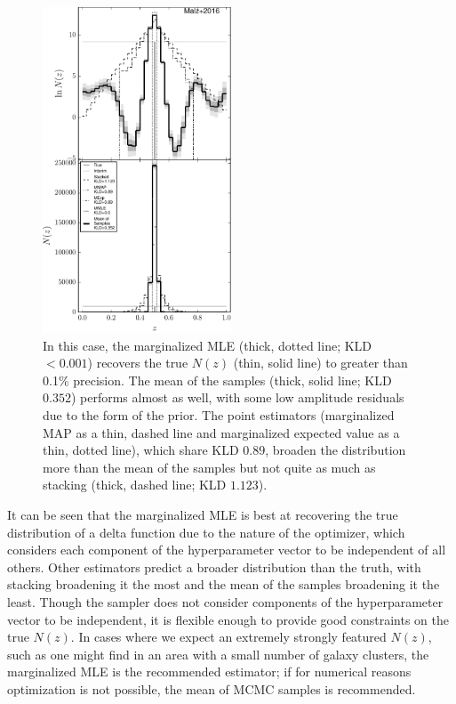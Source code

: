 \documentclass[preprint]{aastex}
\begin{document}

\begin{figure}
\includegraphics[width=0.5\textwidth]{figs/delt/comps.pdf}
\caption{In this case, the marginalized MLE (thick, dotted line; KLD $<0.001$) 
recovers the true $N(z)$ (thin, solid line) to greater than 0.1\% precision.  
The mean of the samples (thick, solid line; KLD $0.352$) performs almost as 
well, with some low amplitude residuals due to the form of the prior.  The 
point estimators (marginalized MAP as a thin, dashed line and marginalized 
expected value as a thin, dotted line), which share KLD $0.89$, broaden the 
distribution more than the mean of the samples but not quite as much as 
stacking (thick, dashed line; KLD $1.123$).}
\label{fig:toy-comp}
\end{figure}

It can be seen that the marginalized MLE is best at recovering the true 
distribution of a delta function due to the nature of the optimizer, which 
considers each component of the hyperparameter vector to be independent of all 
others.  Other estimators predict a broader distribution than the truth, with 
stacking broadening it the most and the mean of the samples broadening it the 
least.  Though the sampler does not consider components of the hyperparameter 
vector to be independent, it is flexible enough to provide good constraints on 
the true $N(z)$.  In cases where we expect an extremely strongly featured 
$N(z)$, such as one might find in an area with a small number of galaxy 
clusters, the marginalized MLE is the recommended estimator; if for numerical 
reasons optimization is not possible, the mean of MCMC samples is recommended.
\end{document}
